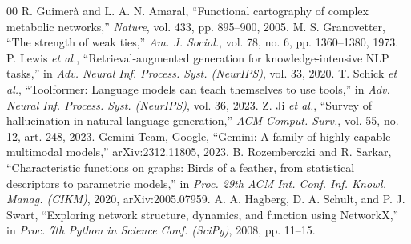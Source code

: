 \documentclass[conference]{IEEEtran}
\begin{document}
\begin{thebibliography}{00}
 R. Guimer\`a and L. A. N. Amaral, ``Functional cartography of complex metabolic networks,'' \emph{Nature}, vol. 433, pp. 895--900, 2005.
 M. S. Granovetter, ``The strength of weak ties,'' \emph{Am. J. Sociol.}, vol. 78, no. 6, pp. 1360--1380, 1973.
 P. Lewis \emph{et al.}, ``Retrieval-augmented generation for knowledge-intensive NLP tasks,'' in \emph{Adv. Neural Inf. Process. Syst. (NeurIPS)}, vol. 33, 2020.
 T. Schick \emph{et al.}, ``Toolformer: Language models can teach themselves to use tools,'' in \emph{Adv. Neural Inf. Process. Syst. (NeurIPS)}, vol. 36, 2023.
 Z. Ji \emph{et al.}, ``Survey of hallucination in natural language generation,'' \emph{ACM Comput. Surv.}, vol. 55, no. 12, art. 248, 2023.
 Gemini Team, Google, ``Gemini: A family of highly capable multimodal models,'' arXiv:2312.11805, 2023.
 B. Rozemberczki and R. Sarkar, ``Characteristic functions on graphs: Birds of a feather, from statistical descriptors to parametric models,'' in \emph{Proc. 29th ACM Int. Conf. Inf. Knowl. Manag. (CIKM)}, 2020, arXiv:2005.07959.
 A. A. Hagberg, D. A. Schult, and P. J. Swart, ``Exploring network structure, dynamics, and function using NetworkX,'' in \emph{Proc. 7th Python in Science Conf. (SciPy)}, 2008, pp. 11--15.
\end{thebibliography}
\end{document}
